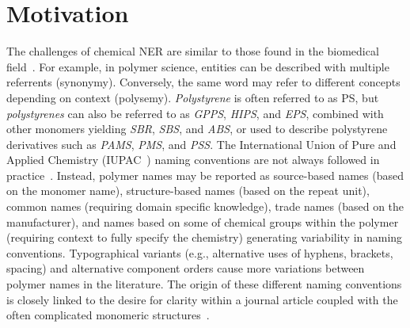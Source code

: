 \section{Motivation}
\label{sect:background}
The challenges of chemical NER are similar to those found in the biomedical field~\cite{krallinger2015chemdner,kim2004introduction}. 
For example, in polymer science, entities can be described with multiple referrents (synonymy).
Conversely, the same word may refer to different concepts depending on context (polysemy).
\textit{Polystyrene} is often referred to as PS, but \textit{polystyrenes} can also be referred to as \textit{GPPS}, \textit{HIPS}, and \textit{EPS}, combined with other monomers yielding \textit{SBR}, \textit{SBS}, and \textit{ABS}, or used to describe polystyrene derivatives such as \textit{PAMS}, \textit{PMS}, and \textit{PSS}.
The International Union of Pure and Applied Chemistry (IUPAC~\cite{hiorns2013brief}) naming conventions are not always followed in practice~\cite{tamames2006success}. 
Instead, polymer names may be reported as source-based names (based on the monomer name), structure-based names (based on the repeat unit), common names (requiring domain specific knowledge), trade names (based on the manufacturer), and names based on some of chemical groups within the polymer (requiring context to fully specify the chemistry) generating variability in naming conventions.
Typographical variants (e.g., alternative uses of hyphens, brackets, spacing) and alternative component orders cause more variations between polymer names in the literature.
The origin of these different naming conventions is closely linked to the desire for clarity within a journal article coupled with the often complicated monomeric structures~\cite{audus2017polymer}.

